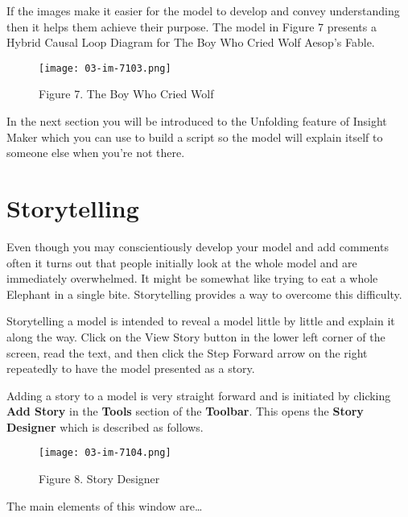\documentclass[]{memoir}
\let\Oldincludegraphics\includegraphics
\renewcommand{\includegraphics}[1]{\Oldincludegraphics[max size={\textwidth}{\textheight}]{#1}}
\renewcommand{\u}[1]{\textbf{#1}}
\begin{document}
If the images make it easier for the model to develop and convey
understanding then it helps them achieve their purpose. The model in
Figure 7 presents a Hybrid Causal Loop Diagram for The Boy Who Cried
Wolf Aesop's Fable.

\begin{figure}[htbp]
\centering
\texttt{[image: 03-im-7103.png]}
\caption{Figure 7. The Boy Who Cried Wolf}
\end{figure}

In the next section you will be introduced to the Unfolding feature of
Insight Maker which you can use to build a script so the model will
explain itself to someone else when you're not there.

\section{Storytelling}

Even though you may conscientiously develop your model and add comments
often it turns out that people initially look at the whole model and are
immediately overwhelmed. It might be somewhat like trying to eat a whole
Elephant in a single bite. Storytelling provides a way to overcome this
difficulty.

Storytelling a model is intended to reveal a model little by little and
explain it along the way. Click on the View Story button in the lower
left corner of the screen, read the text, and then click the Step
Forward arrow on the right repeatedly to have the model presented as a
story.

Adding a story to a model is very straight forward and is initiated by
clicking \u{Add Story} in the \u{Tools} section of the \u{Toolbar}. This
opens the \u{Story Designer} which is described as follows.

\begin{figure}[htbp]
\centering
\texttt{[image: 03-im-7104.png]}
\caption{Figure 8. Story Designer}
\end{figure}

The main elements of this window are\ldots{}
\end{document}
